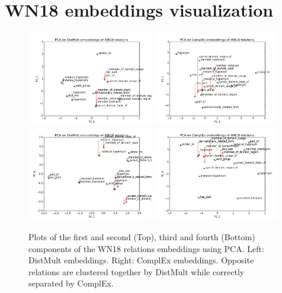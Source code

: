 \documentclass{article}
\begin{document}
\section{WN18 embeddings visualization}
\label{app:wn18_pca}


\begin{figure}[!ht]%
	\centering
	\includegraphics[width=0.49\textwidth]{distmult_pca_12.png}
	\includegraphics[width=0.49\textwidth]{complex_pca_12.png}
	\includegraphics[width=0.49\textwidth]{distmult_pca_34.png}
	\includegraphics[width=0.49\textwidth]{complex_pca_34.png}
	\vspace{-5mm}
	\caption{Plots of the first and second (Top), third and fourth (Bottom) components of the WN18 relations embeddings using PCA. Left: DistMult embeddings. Right: ComplEx embeddings. Opposite
	relations are clustered together by DistMult while correctly separated by ComplEx.}
	\label{fig:pca}
\end{figure}
\end{document}

